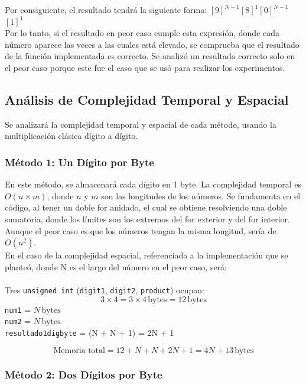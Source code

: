 \documentclass[10pt]{article}
\begin{document}
Por consiguiente, el resultado tendrá la siguiente forma:
\([9]^{N-1}\)\([8]^{1}\)\([0]^{N-1}\)\([1]^{1}\)\\

Por lo tanto, si el resultado en peor caso cumple esta expresión, donde cada número aparece las veces a las cuales está elevado, se comprueba que el resultado de la función implementada es correcto. Se analizó un resultado correcto solo en el peor caso porque este fue el caso que se usó para realizar los experimentos.

\subsection{Análisis de Complejidad Temporal y Espacial}

Se analizará la complejidad temporal y espacial de cada método, usando la multiplicación clásica dígito a dígito.

\subsubsection{Método 1: Un Dígito por Byte}

En este método, se almacenará cada dígito en 1 byte. La complejidad temporal es $O(n \times m)$, donde $n$ y $m$ son las longitudes de los números. Se fundamenta en el código, al tener un doble for anidado, el cual se obtiene resolviendo una doble sumatoria, donde los límites son los extremos del for exterior y del for interior. Aunque el peor caso es que los números tengan la misma longitud, sería de $O(n^2)$. \\
En el caso de la complejidad espacial, referenciada a la implementación que se planteó, donde N es el largo del número en el peor caso, será: \\\\
Tres \texttt{unsigned int} (\texttt{digit1}, \texttt{digit2}, \texttt{product}) ocupan:
\[
3 \times 4 = 3 \times 4 \, \text{bytes} = 12 \, \text{bytes}
\]
\texttt{num1} = \(N \, \text{bytes}\) \\
\texttt{num2} = \(N \, \text{bytes}\) \\
\texttt{resultado1digbyte} = (N + N + 1)  = 2N + 1 \, 

\[
\text{Memoria total} = 12 + N + N + 2N + 1 = 4N + 13 \, \text{bytes}
\]

\subsubsection{Método 2: Dos Dígitos por Byte}
\end{document}
